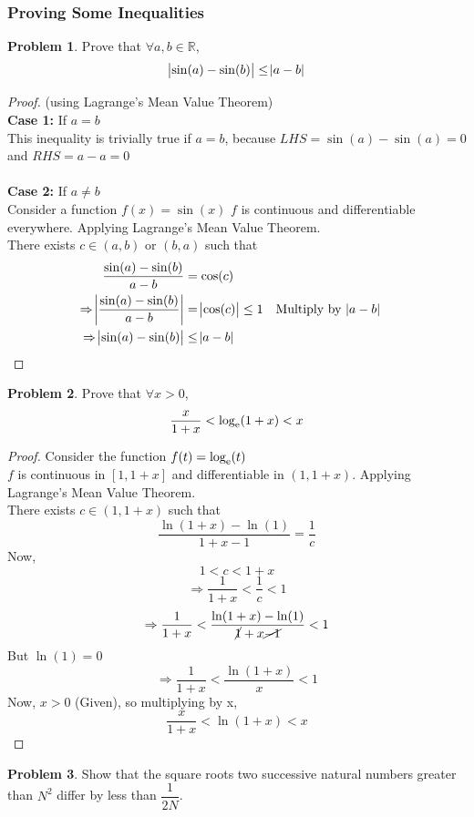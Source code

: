 \documentclass[14]{article}
\theoremstyle{definition}
\newtheorem{prob}{Problem}
\begin{document}
\subsubsection*{Proving Some Inequalities}
\begin{prob}
Prove that $\forall a, b \in \mathbb{R}$, 
\[\abs{\sin(a) - \sin(b)} \leq \abs{a - b}\]
\end{prob}
\begin{proof} (using Lagrange's Mean Value Theorem)\\
\textbf{Case 1:} If $a = b$\\
This inequality is trivially true if $a = b$, because $LHS = \sin(a) - \sin(a) = 0$ and $RHS = a - a = 0$\\\\
\textbf{Case 2:} If $a \neq b$\\
Consider a function $f(x) = \sin(x)$
$f$ is continuous and differentiable everywhere. Applying Lagrange's Mean Value Theorem.\\
There exists $c \in (a, b)$ or $(b, a)$ such that
\begin{align*}
\dfrac{\sin(a) - \sin(b)}{a - b} &= \cos(c)\\
\Rightarrow \abs{\dfrac{\sin(a) - \sin(b)}{a - b}} &= \abs{\cos(c)} \leq 1 && \text{Multiply by } \abs{a - b}\\
\Rightarrow \abs{\sin(a) - \sin(b)} &\leq \abs{a - b}
\end{align*}
\end{proof}
\begin{prob}
Prove that $\forall x > 0$,
\[\dfrac{x}{1+x} < \log_{\rm e}(1+x) < x\]
\end{prob}
\begin{proof}
Consider the function $f(t) = \log_{\rm e}(t)$\\
$f$ is continuous in $[1, 1+x]$ and differentiable in $(1, 1+x)$. Applying Lagrange's Mean Value Theorem.\\
There exists $c \in (1, 1 + x)$ such that
\[\dfrac{\ln(1 + x) - \ln(1)}{1 + x - 1} = \dfrac1{c}\]
Now,
\[1 < c < 1+x\]
\[\Rightarrow \dfrac1{1 + x} < \dfrac1{c} < 1\]
\[\Rightarrow \dfrac1{1 + x} < \dfrac{\ln(1 + x) - \ln(1)}{\cancel{1} + x \cancel{- 1}} < 1\]
But $\ln(1) = 0$
\[\Rightarrow \dfrac1{1 + x} < \dfrac{\ln(1 + x)}{x} < 1\]
Now, $x > 0$ (Given), so multiplying by x,
\[\dfrac{x}{1 + x} < \ln(1+x) < x\]
\end{proof}
\pagebreak
\begin{prob}
Show that the square roots two successive natural numbers greater than $N^2$ differ by less than $\dfrac1{2N}$.
\end{prob}
\end{document}
